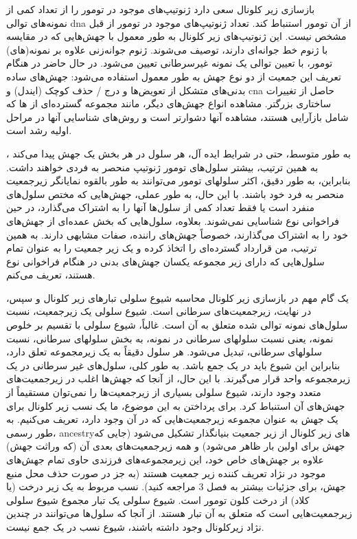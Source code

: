 بازسازی زیر کلونال سعی دارد ژنوتیپ‌های موجود در تومور را از تعداد کمی از نمونه‌های توالی \gls{dna} از آن تومور استنباط کند. تعداد ژنوتیپ‌های موجود در تومور از قبل مشخص نیست. این ژنوتیپ‌های زیر کلونال به طور معمول با جهش‌هایی که در مقایسه با ژنوم خط جوانه‌ای دارند، توصیف می‌شوند. ژنوم جوانه‌زنی علاوه بر نمونه(های) تومور، با تعیین توالی یک نمونه غیرسرطانی تعیین می‌شود. در حال حاضر در هنگام تعریف این جمعیت از دو نوع جهش به طور معمول استفاده می‌شود: جهش‌های ساده بدنی‌های متشکل از تعویض‌ها و درج / حذف کوچک (ایندل) و \gls{cna} حاصل از تغییرات ساختاری بزرگتر. مشاهده انواع جهش‌های دیگر، مانند مجموعه گسترده‌ای از ‌ها که شامل بازآرایی هستند، مشاهده آنها دشوارتر است و روش‌های شناسایی آنها در مراحل اولیه رشد است.


به طور متوسط، حتی در شرایط ایده آل، هر سلول در هر بخش یک جهش پیدا می‌کند \cite{behjati2014genome}، به همین ترتیب، بیشتر سلول‌های تومور ژنوتیپ منحصر به فردی خواهند داشت. بنابراین، به طور دقیق، اکثر سلولهای تومور می‌توانند به طور بالقوه نمایانگر زیرجمعیت منحصر به فرد خود باشند. با این حال، به طور عملی، جهش‌هایی که مختص سلول‌های منفرد است یا فقط تعداد کمی از سلول‌ها آنها را به اشتراک می‌گذارد، در حین فراخوانی نوع شناسایی نمی‌شوند. بعلاوه، سلول‌هایی که بخش عمده‌ای از جهش‌های خود را به اشتراک می‌گذارند، خصوصاً جهش‌های راننده، صفات مشابهی دارند. به همین ترتیب، من قرارداد گسترده‌ای را اتخاذ کرده و یک زیر جمعیت را به عنوان تمام سلول‌هایی که دارای زیر مجموعه یکسان جهش‌های بدنی در هنگام فراخوانی نوع هستند، تعریف می‌کنم.


یک گام مهم در بازسازی زیر کلونال محاسبه شیوع سلولی تبارهای زیر کلونال و سپس، در نهایت، زیرجمعیت‌های سرطانی است. شیوع سلولی یک زیرجمعیت، نسبت سلول‌های نمونه توالی شده متعلق به آن است. غالباً، شیوع سلولی با تقسیم بر خلوص نمونه، یعنی نسبت سلولهای سرطانی در نمونه، به بخش سلولهای سرطانی، نسبت سلولهای سرطانی، تبدیل می‌شود. هر سلول دقیقاً به یک زیرمجموعه تعلق دارد، بنابراین این شیوع باید در یک جمع باشد. به طور کلی، سلول‌های غیر سرطانی در یک زیرمجموعه واحد قرار می‌گیرند. با این حال، از آنجا که جهش‌ها اغلب در زیرجمعیت‌های متعدد وجود دارند، شیوع سلولی بسیاری از زیرجمعیت‌ها را نمی‌توان مستقیماً از جهش‌های آن استنباط کرد. برای پرداختن به این موضوع، ما یک نسب زیر کلونال برای یک جهش به عنوان مجموعه زیرجمعیت‌هایی که در آن وجود دارد، تعریف می‌کنیم. به طور رسمی، \gls{ancestry}‌های زیر کلونال از زیر جمعیت بنیانگذار تشکیل می‌شود (جایی که جهش برای اولین بار ظاهر می‌شود) و همه زیرجمعیت‌های بعدی آن (که وراثت جهش) علاوه بر جهش‌های خاص خود، این زیرمجموعه‌های فرزندی حاوی تمام جهش‌های موجود در نژاد تعریف کننده زیر جمعیت هستند (به جز در صورت حذف محل منبع جهش، برای جزئیات بیشتر به فصل 3 مراجعه کنید). نسب مربوط به یک زیر درخت (یا کلاد) از درخت کلون تومور است. شیوع سلولی یک تبار مجموع شیوع سلولی زیرجمعیت‌هایی است که متعلق به آن تبار هستند. از آنجا که سلول‌ها می‌توانند در چندین نژاد زیرکلونال وجود داشته باشند، شیوع نسب در یک جمع نیست.



